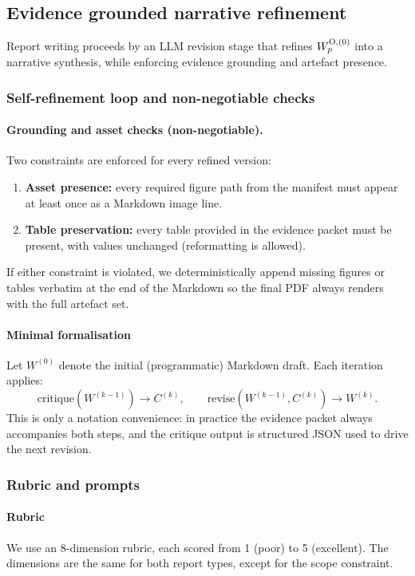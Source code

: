 \subsection{Evidence grounded narrative refinement}
Report writing proceeds by an LLM revision stage that refines $W^{\textsc{O},(0)}_p$ into a narrative synthesis, while enforcing evidence grounding and artefact presence.

\subsubsection*{Self-refinement loop and non-negotiable checks}
\paragraph{Grounding and asset checks (non-negotiable).}
Two constraints are enforced for every refined version:
\begin{enumerate}[leftmargin=*, itemsep=-2pt]
    \item \textbf{Asset presence:} every required figure path from the manifest must appear at least once as a Markdown image line.
    \item \textbf{Table preservation:} every table provided in the evidence packet must be present, with values unchanged (reformatting is allowed).
\end{enumerate}
If either constraint is violated, we deterministically append missing figures or tables verbatim at the end of the Markdown so the final PDF always renders with the full artefact set.

\paragraph{Minimal formalisation}
Let $W^{(0)}$ denote the initial (programmatic) Markdown draft.
Each iteration applies:
\[
\text{critique}(W^{(k-1)}) \rightarrow C^{(k)}, \qquad \text{revise}(W^{(k-1)}, C^{(k)}) \rightarrow W^{(k)}.
\]
This is only a notation convenience: in practice the evidence packet always accompanies both steps, and the critique output is structured JSON used to drive the next revision.

\subsubsection*{Rubric and prompts}
\paragraph{Rubric}
We use an 8-dimension rubric, each scored from 1 (poor) to 5 (excellent). The dimensions are the same for both report types, except for the scope constraint.

